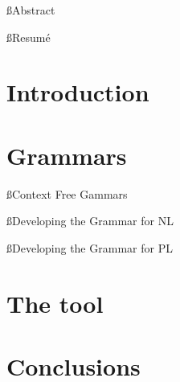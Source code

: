 \documentclass[a4paper]{article}
\title{}
\begin{document}
\begin{titlepage}
\maketitle
\thispagestyle{empty}
\end{titlepage}

\tableofcontents
\thispagestyle{empty}
\pagebreak
{}

\ss{Abstract}

\ss{Resumé}

\section{Introduction}

\section{Grammars}
\ss{Context Free Gammars}

\ss{Developing the Grammar for NL}

\ss{Developing the Grammar for PL}

\section{The tool}

\section{Conclusions}


\label{LastBody}
\pagebreak
{}
\nocite{*}


\label{LastBio}
\label{LastPage}
\end{document}

